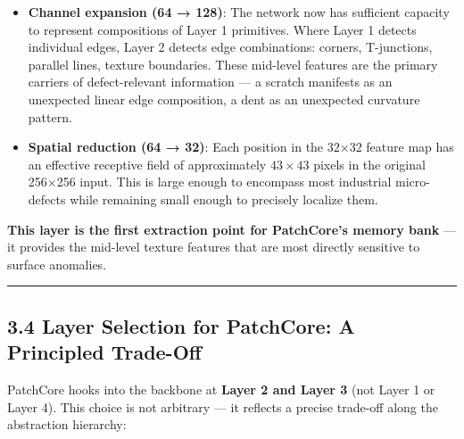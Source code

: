 \begin{itemize}
\item
  \textbf{Channel expansion (64 → 128)}: The network now has sufficient capacity to represent compositions of Layer 1 primitives. Where Layer 1 detects individual edges, Layer 2 detects edge combinations: corners, T-junctions, parallel lines, texture boundaries. These mid-level features are the primary carriers of defect-relevant information --- a scratch manifests as an unexpected linear edge composition, a dent as an unexpected curvature pattern.
\item
  \textbf{Spatial reduction (64 → 32)}: Each position in the 32×32 feature map has an effective receptive field of approximately \(43 \times 43\) pixels in the original 256×256 input. This is large enough to encompass most industrial micro-defects while remaining small enough to precisely localize them.
\end{itemize}

\textbf{This layer is the first extraction point for PatchCore's memory bank} --- it provides the mid-level texture features that are most directly sensitive to surface anomalies.

\begin{center}\rule{0.5\linewidth}{0.5pt}\end{center}

\subsection{3.4 Layer Selection for PatchCore: A Principled Trade-Off}\label{layer-selection-for-patchcore-a-principled-trade-off}

PatchCore hooks into the backbone at \textbf{Layer 2 and Layer 3} (not Layer 1 or Layer 4). This choice is not arbitrary --- it reflects a precise trade-off along the abstraction hierarchy:

